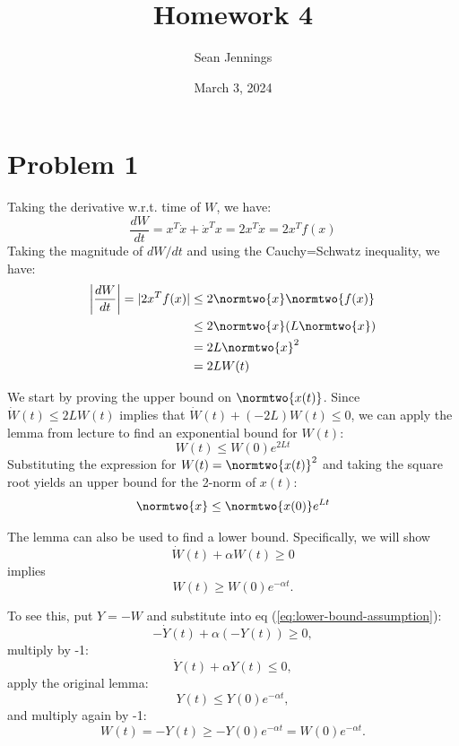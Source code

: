 \documentclass{homework}
\title{Homework 4}
\author{Sean Jennings}
\date{March 3, 2024}
\begin{document}
\maketitle

\section{Problem 1}
\begin{letterenum}
\item Taking the derivative w.r.t. time of $W$, we have:
\begin{equation*}
    \frac{dW}{dt} = x^T \dot{x} + \dot{x}^T x = 2 x^T \dot{x} = 2 x^T f(x)
\end{equation*}
Taking the magnitude of $dW/dt$ and using the Cauchy=Schwatz inequality, we have:
\begin{align*}
    \biggl|\frac{dW}{dt}\biggr| = |2 x^T f(x) | &\leq 2 \normtwo{x} \normtwo{f(x)} \\
        &\leq 2 \normtwo{x} (L \normtwo{x}) \\
        &= 2L \normtwo{x}^2 \\
        &= 2L W(t)
\end{align*}

\item We start by proving the upper bound on $\normtwo{x(t)}$.
Since $\dot{W}(t) \leq 2LW(t)$ implies that $\dot{W}(t) + (-2L)W(t) \leq 0$,
we can apply the lemma from lecture to find an exponential bound for $W(t)$:
\begin{equation*}
    W(t) \leq W(0) e^{2Lt}
\end{equation*}
Substituting the expression for $W(t) = \normtwo{x(t)}^2$ and taking the square root yields
an upper bound for the 2-norm of $x(t)$:
\begin{equation*}
    \normtwo{x} \leq \normtwo{x(0)} e^{Lt}
\end{equation*}

The lemma can also be used to find a lower bound. Specifically, we will show
 \begin{equation}
    \dot{W}(t) + \alpha W(t) \geq 0
    \label{eq:lower-bound-assumption}
 \end{equation}
 implies
 \begin{equation*}
    W(t) \geq W(0) e^{-\alpha t}.
 \end{equation*}

To see this, put $Y = -W$ and substitute into eq (\ref{eq:lower-bound-assumption}):
\begin{equation*}
    -\dot{Y}(t) + \alpha (-Y(t)) \geq 0,
\end{equation*}
multiply by -1:
\begin{equation*}
    \dot{Y}(t) + \alpha Y(t) \leq 0,
\end{equation*}
apply the original lemma:
\begin{equation*}
    Y(t) \leq Y(0) e^{-\alpha t},
\end{equation*}
and multiply again by -1:
\begin{equation*}
    W(t) = -Y(t) \geq -Y(0) e^{-\alpha t} = W(0) e^{-\alpha t}.
\end{equation*}


\end{letterenum}
\end{document}
